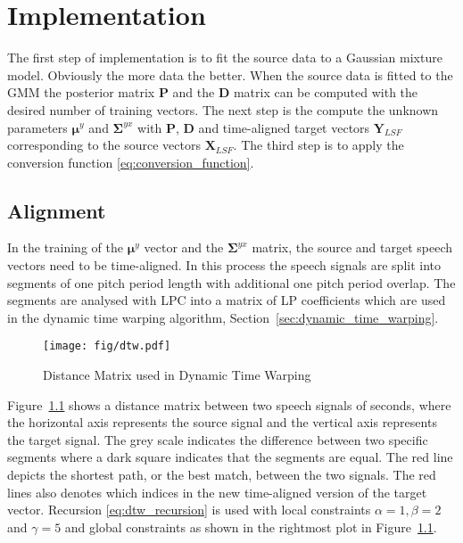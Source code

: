 \chapter{Implementation} %
\label{cha:implementation}
The first step of implementation is to fit the source data to a Gaussian mixture model. Obviously the more data the better. When the source data is fitted to the GMM the posterior matrix $\mathbf{P}$ and the $\mathbf{D}$ matrix can be computed with the desired number of training vectors. The next step is the compute the unknown parameters $\boldsymbol{\mu}^y$ and $\mathbf{\Sigma}^{yx}$ with $\mathbf{P}$, $\mathbf{D}$ and time-aligned target vectors $\mathbf{Y}_{LSF}$ corresponding to the source vectors $\mathbf{X}_{LSF}$. The third step is to apply the conversion function \eqref{eq:conversion_function}.


\section{Alignment} %
\label{sec:alignment}
In the training of the $\boldsymbol{\mu}^y$ vector and the $\mathbf{\Sigma}^{yx}$ matrix, the source and target speech vectors need to be time-aligned. In this process the speech signals are split into segments of one pitch period length with additional one pitch period overlap. The segments are analysed with LPC into a matrix of LP coefficients which are used in the dynamic time warping algorithm, Section~\ref{sec:dynamic_time_warping}.

\begin{figure}[htbp]
	\begin{center}
		\texttt{[image: fig/dtw.pdf]}
		\caption{Distance Matrix used in Dynamic Time Warping}
		\label{fig:dtw}
	\end{center}
\end{figure}
Figure~\ref{fig:dtw} shows a distance matrix between two speech signals of  seconds, where the horizontal axis represents the source signal and the vertical axis represents the target signal. The grey scale indicates the difference between two specific segments where a dark square indicates that the segments are equal. The red line depicts the shortest path, or the best match, between the two signals. The red lines also denotes which indices in the new time-aligned version of the target vector. Recursion \eqref{eq:dtw_recursion} is used with local constraints $\alpha=1, \beta=2$ and $\gamma=5$ and global constraints as shown in the rightmost plot in Figure~\ref{fig:dtw}.

